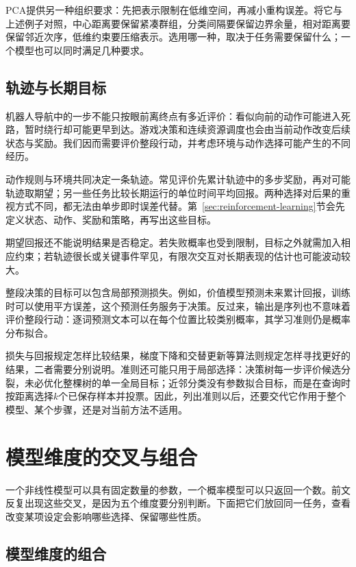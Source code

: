 PCA提供另一种组织要求：先把表示限制在低维空间，再减小重构误差。将它与上述例子对照，中心距离要保留紧凑群组，分类间隔要保留边界余量，相对距离要保留邻近次序，低维约束要压缩表示。选用哪一种，取决于任务需要保留什么；一个模型也可以同时满足几种要求。

\FloatBarrier
\subsection{轨迹与长期目标}
\label{sec:models-sequence-objectives}

机器人导航中的一步不能只按眼前离终点有多近评价：看似向前的动作可能进入死路，暂时绕行却可能更早到达。游戏决策和连续资源调度也会由当前动作改变后续状态与奖励。我们因而需要评价整段行动，并考虑环境与动作选择可能产生的不同经历。

动作规则与环境共同决定一条轨迹。常见评价先累计轨迹中的多步奖励，再对可能轨迹取期望；另一些任务比较长期运行的单位时间平均回报。两种选择对后果的重视方式不同，都无法由单步即时误差代替。第~\ref{sec:reinforcement-learning}节会先定义状态、动作、奖励和策略，再写出这些目标。

期望回报还不能说明结果是否稳定。若失败概率也受到限制，目标之外就需加入相应约束；若轨迹很长或关键事件罕见，有限次交互对长期表现的估计也可能波动较大。

整段决策的目标可以包含局部预测损失。例如，价值模型预测未来累计回报，训练时可以使用平方误差，这个预测任务服务于决策。反过来，输出是序列也不意味着评价整段行动：逐词预测文本可以在每个位置比较类别概率，其学习准则仍是概率分布拟合。

损失与回报规定怎样比较结果，梯度下降和交替更新等算法则规定怎样寻找更好的结果，二者需要分别说明。准则还可能只用于局部选择：决策树每一步评价候选分裂，未必优化整棵树的单一全局目标；近邻分类没有参数拟合目标，而是在查询时按距离选择$k$个已保存样本并投票。因此，列出准则以后，还要交代它作用于整个模型、某个步骤，还是对当前方法不适用。

\FloatBarrier
\section{模型维度的交叉与组合}
\label{sec:models-crossing}

一个非线性模型可以具有固定数量的参数，一个概率模型可以只返回一个数。前文反复出现这些交叉，是因为五个维度要分别判断。下面把它们放回同一任务，查看改变某项设定会影响哪些选择、保留哪些性质。

\subsection{模型维度的组合}
\label{sec:models-dimension-combination}

